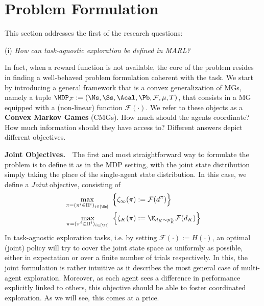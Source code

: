 \section{Problem Formulation}
\label{sec:problem_formulation}
This section addresses the first of the research questions:
\begin{center}
    (i) \emph{How can task-agnostic exploration be defined in MARL?}
\end{center}
In fact, when a reward function is not available, the core of the problem resides in finding a well-behaved problem formulation coherent with the task. We start by introducing a general framework that is a convex generalization of MGs, namely a tuple $\MDP_{\mathcal F} := (\Ns, \Ss, \Acal, \Pb, \mathcal F, \mu, T)$, that consists in a MG equipped with a (non-linear) function $\mathcal F(\cdot)$. We refer to these objects as a \textbf{Convex Markov Games} (CMGs). How much should the agents coordinate? How much information should they have access to? Different answers depict different objectives.

\textbf{Joint Objectives.}~~The first and most straightforward way to formulate the problem is to define it as in the MDP setting, with the joint state distribution simply taking the place of the single-agent state distribution. In this case, we define a \emph{Joint} objective, consisting of
\begin{align}
\vspace{-5pt}
\max_{\pi = (\pi^i\in \Pi^i)_{i \in [\Ns]}} \ \Big\{ \zeta_\infty(\pi) &:= \mathcal F(d^\pi)\Big\} \label{eq:mse} \\ 
\max_{\pi = (\pi^i\in \Pi^i)_{i \in [\Ns]}} \ \Big\{ \zeta_K(\pi) &:=\E_{d_K\sim p^\pi_K}\mathcal F (d_K)\Big\} \label{eq:mse_finite} 
\end{align}
In task-agnostic exploration tasks, i.e. by setting $\mathcal F(\cdot) := H(\cdot)$, an optimal (joint) policy will try to cover the joint state space as uniformly as possible, either in expectation or over a finite number of trials respectively. In this, the joint formulation is rather intuitive as it describes the most general case of multi-agent exploration. Moreover, as each agent sees a difference in performance explicitly linked to others, this objective should be able to foster coordinated exploration. As we will see, this comes at a price.

